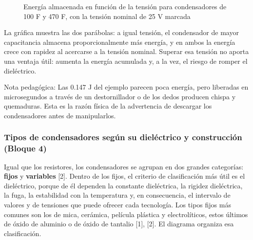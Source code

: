 \documentclass[11pt,letterpaper]{article}
\begin{document}
\begin{figure}[H]
  \caption{Energía almacenada en función de la tensión para condensadores de 100 \textmu{}F y 470 \textmu{}F, con la tensión nominal de 25 V marcada}
\end{figure}

La gráfica muestra las dos parábolas: a igual tensión, el condensador de mayor capacitancia almacena proporcionalmente más energía, y en ambos la energía crece con rapidez al acercarse a la tensión nominal. Superar esa tensión no aporta una ventaja útil: aumenta la energía acumulada y, a la vez, el riesgo de romper el dieléctrico.

\begin{nota}{Nota pedagógica:}
Las 0.147 J del ejemplo parecen poca energía, pero liberadas en microsegundos a través de un destornillador o de los dedos producen chispa y quemaduras. Esta es la razón física de la advertencia de descargar los condensadores antes de manipularlos.
\end{nota}

\subsubsection{Tipos de condensadores según su dieléctrico y construcción (Bloque 4)}

Igual que los resistores, los condensadores se agrupan en dos grandes categorías: \textbf{fijos} y \textbf{variables} [2]. Dentro de los fijos, el criterio de clasificación más útil es el dieléctrico, porque de él dependen la constante dieléctrica, la rigidez dieléctrica, la fuga, la estabilidad con la temperatura y, en consecuencia, el intervalo de valores y de tensiones que puede ofrecer cada tecnología. Los tipos fijos más comunes son los de mica, cerámica, película plástica y electrolíticos, estos últimos de óxido de aluminio o de óxido de tantalio [1], [2]. El diagrama organiza esa clasificación.
\end{document}
